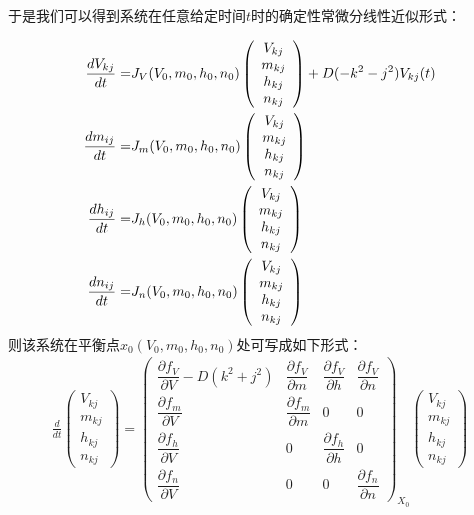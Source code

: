 \documentclass[
    bachelor,
    nofont, %
    pdflinks,
    ]{xjtuthesis}
\begin{document}
于是我们可以得到系统在任意给定时间$t$时的确定性常微分线性近似形式：

\begin{align}
\notag  \dfrac{d V_{kj}}{d t} = & J_{V}(V_0,m_0,h_0,n_0)
\left(
\begin{array}{c}
V_{kj}\\
m_{kj}\\
h_{kj}\\
n_{kj}
\end{array}
\right)+D(-k^2-j^2)V_{kj}(t)\\
\dfrac{d m_{ij}}{d t} = & J_{m}(V_0,m_0,h_0,n_0)
\left(
\begin{array}{c}
V_{kj}\\
m_{kj}\\
h_{kj}\\
n_{kj}
\end{array}
\right) \\
\notag \dfrac{d h_{ij}}{d t} = & J_{h}(V_0,m_0,h_0,n_0)
\left(
\begin{array}{c}
V_{kj}\\
m_{kj}\\
h_{kj}\\
n_{kj}
\end{array}
\right)\\
\notag \dfrac{d n_{ij}}{d t} = & J_{n}(V_0,m_0,h_0,n_0)
\left(
\begin{array}{c}
V_{kj}\\
m_{kj}\\
h_{kj}\\
n_{kj}
\end{array}
\right) 
\end{align}
则该系统在平衡点$x_0(V_{0},m_{0},h_{0},n_{0})$处可写成如下形式：
\begin{align}
\frac{d}{dt} \left( \begin{array}{c}
V_{kj}\\
m_{kj}\\
h_{kj}\\
n_{kj}
\end{array}
\right)
=\left(                
  \begin{array}{cccc}   
    \dfrac{\partial f_V}{\partial V}-D(k^2+j^2) & \dfrac{\partial f_V}{\partial m} & \dfrac{\partial f_V}{\partial h} & \dfrac{\partial f_V}{\partial n}\\  
    \dfrac{\partial f_m}{\partial V} & \dfrac{\partial f_m}{\partial m} & 0 & 0\\   
    \dfrac{\partial f_h}{\partial V} & 0  & \dfrac{\partial f_h}{\partial h} & 0 \\
    \dfrac{\partial f_n}{\partial V} & 0 & 0 & \dfrac{\partial f_n}{\partial n} 
  \end{array}
\right)_{X_0}
\left(
\begin{array}{c}
V_{kj}\\
m_{kj}\\
h_{kj}\\
n_{kj}
\end{array}
\right)     
\end{align}
\end{document}
